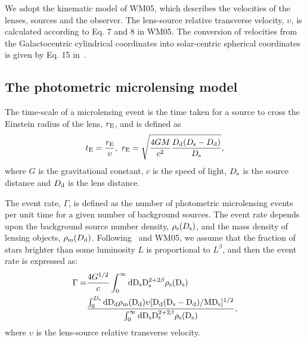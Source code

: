 \documentclass[iop,apj]{emulateapj}
\begin{document}
We adopt the kinematic model of WM05, which describes the 
velocities of the lenses, sources and the observer. The lens-source 
relative transverse velocity, $\upsilon$, is calculated according 
to Eq. 7 and 8 in WM05. The conversion of velocities from the 
Galactocentric cylindrical coordinates into solar-centric spherical
coordinates is given by Eq. 15 in~\citet{wang}.

\subsection{The photometric microlensing model}

The time-scale of a microlensing event is the
time taken for a source to cross the Einstein radius of the lens,
$r_{\rm{E}}$, and is defined as~\citep{Paczynski1996}
%
\begin{equation}
\label{te}
t_{\rm{E}}=\frac{r_{\rm{E}}}{\upsilon},\
r_{\rm{E}}=\sqrt{\frac{4GM}{c^{2}}\frac{D_{\rm{d}}(D_{\rm{s}}-D_{\rm{d}})}{D_{\rm{s}}}},
\end{equation}
%
where $G$ is the gravitational constant, $c$ is the speed of light, $D_{\rm{s}}$ is 
the source distance and $D_{\rm{d}}$ is the lens distance.

The event rate, $\Gamma$, is defined as the number of photometric microlensing 
events per unit time for a given number of background sources.
%
The event rate depends upon the background source number density, $\rho_{\rm{s}}(D_{\rm{s}})$, 
and the mass density of lensing objects, $\rho_{\rm{m}}(D_{\rm{d}})$.
%
Following~\citet{kiraga} and WM05, we assume that the fraction of 
stars brighter than some luminosity $L$ is proportional to $L^{\beta}$, and 
then the event rate is expressed as:
%
\begin{equation}
\label{rate}
\begin{split}
\Gamma=&\frac{4G^{1/2}}{c}\int_{0}^{\infty}\rm{d}D_{\rm{s}}D_{\rm{s}}^{2+2\beta}\rho_{\rm{s}}(D_{\rm{s}})\\
	     &\frac{\int_{0}^{D_{\rm{s}}}\rm{d}D_{\rm{d}}\rho_{\rm{m}}(D_{\rm{d}})\upsilon[D_{\rm{d}}(D_{\rm{s}}-D_{\rm{d}})/MD_{\rm{s}}]^{1/2}}{\int_{0}^{\infty}\rm{d}D_{\rm{s}}D_{\rm{s}}^{2+2\beta}\rho_{\rm{s}}(D_{\rm{s}})},
\end{split}
\end{equation}
%
where $\upsilon$ is the lens-source relative transverse velocity.
%
\end{document}
